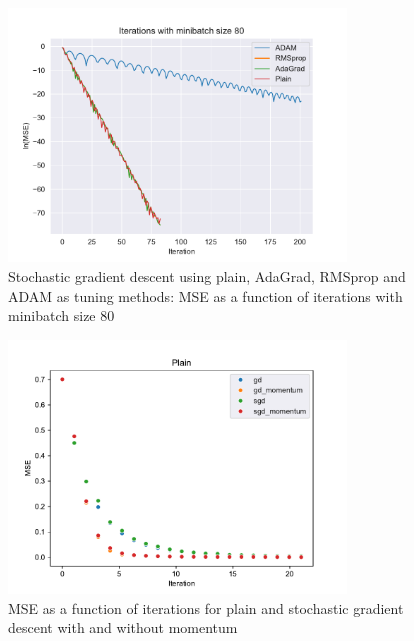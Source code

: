 \begin{figure}[H]
\centering
\includegraphics[width=0.8\textwidth]{Figures/PartA/minibatch_80_MSE(iter).pdf}
\caption{Stochastic gradient descent using plain, AdaGrad, RMSprop and ADAM as tuning methods: MSE as a function of iterations with minibatch size 80}
\label{fig:minibatch_80_MSE-iter-pdf}
\end{figure}

\begin{figure}[H]
\centering
\includegraphics[width=0.8\textwidth]{Figures/PartA/PlainMSE(iter).pdf}
\caption{MSE as a function of iterations for plain and stochastic gradient descent with and without momentum}
\label{fig:PlainMSE-iter-pdf}
\end{figure}

